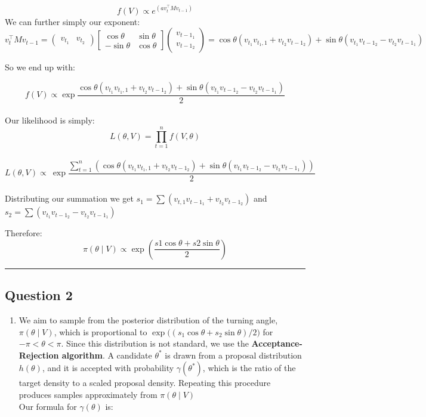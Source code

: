 \documentclass[12pt,halfline,a4paper,]{ouparticle}
\providecommand{\tightlist}{%
  \setlength{\itemsep}{0pt}\setlength{\parskip}{0pt}}
\begin{document}
\[f(V) \propto e^{(av_t^\top Mv_{t-1})}\] We can further simply our
exponent:\\
\[v_t^\top Mv_{t-1}=\begin{pmatrix} v_{t_1} & v_{t_2} \end{pmatrix}\begin{bmatrix}
\cos \theta & \sin \theta \\
- \sin \theta & \cos \theta
\end{bmatrix}\begin{pmatrix} v_{t-1_1} \\ v_{t-1_2} \end{pmatrix}= \cos\theta(v_{t_1} v_{t_1,1} +v_{t_2} v_{t-1_2}) +\sin\theta(v_{t_1} v_{t-1_2} -v_{t_2} v_{t-1_1}) \]

So we end up with:

\[f(V) \propto \exp\frac{\cos\theta(v_{t_1} v_{t_1,1} +v_{t_2} v_{t-1_2}) +\sin\theta(v_{t_1} v_{t-1_2} -v_{t_2} v_{t-1_1})}{2}\]\\
Our likelihood is simply:\\
\[L(\theta,V) = \prod_{t=1}^n f(V, \theta)\]\\
\[L(\theta,V)   \propto\ \exp\frac{\sum_{t=1}^n(\cos\theta(v_{t_1} v_{t_1,1} +v_{t_2} v_{t-1_2}) +\sin\theta(v_{t_1} v_{t-1_2} -v_{t_2} v_{t-1_1}))}{2}\]\\
Distributing our summation we get
\(s_1 =\sum(v_{t,1} v_{t-1_1} +v_{t_2} v_{t-1_2})\) and
\(s_2 =\sum(v_{t_1} v_{t-1_2} -v_{t_2} v_{t-1_1})\)

Therefore:
\[\pi(\theta \mid V) \propto \exp({\frac{s1 \cos \theta + s2 \sin \theta}{2}})\]

\begin{center}\rule{0.5\linewidth}{0.5pt}\end{center}

\subsection{Question 2}\label{question-2}

\begin{enumerate}
\def\labelenumi{(\alph{enumi})}
\tightlist
\item
  We aim to sample from the posterior distribution of the turning angle,
  \(\pi(\theta \mid V)\), which is proportional to
  \(\exp\big((s_1\cos\theta + s_2\sin\theta)/2\big)\) for
  \(-\pi < \theta < \pi\). Since this distribution is not standard, we
  use the \textbf{Acceptance-Rejection algorithm}. A candidate
  \(\theta^*\) is drawn from a proposal distribution \(h(\theta)\), and
  it is accepted with probability \(\gamma(\theta^*)\), which is the
  ratio of the target density to a scaled proposal density. Repeating
  this procedure produces samples approximately from
  \(\pi(\theta \mid V)\)\\
  Our formula for \(\gamma(\theta)\) is:
\end{enumerate}
\end{document}
